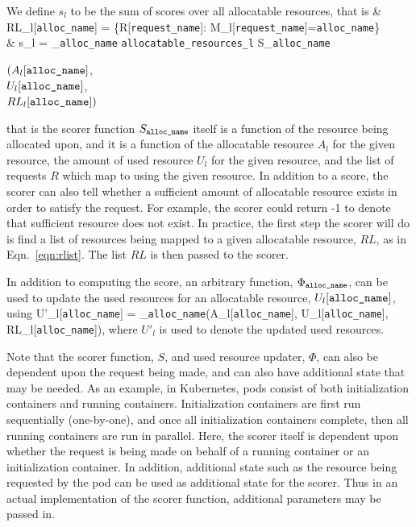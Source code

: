 \documentclass[12pt,onecolumn]{IEEEtran}
\newcommand{\bus}{\_\allowbreak}
\begin{document}
We define $s_l$ to be the sum of scores over all allocatable resources,
that is
\bea
& RL_l[\texttt{alloc{\bus}name}] = \{R[\texttt{request{\bus}name}]: M_l[\texttt{request{\bus}name}]=\texttt{alloc{\bus}name}\} \label{eqn:rlist} \\
& s_l = \sum\limits_{\texttt{alloc{\bus}name} \in \texttt{allocatable{\bus}resources{\bus}l}} 
  S_{\texttt{alloc{\bus}name}}
\parbox[t]{3in}{
$(A_l[\texttt{alloc{\bus}name}]$, \\
$U_l[\texttt{alloc{\bus}name}]$, \\
$RL_l[\texttt{alloc{\bus}name}])$
}
\label{eqn:scorel}
\eea
that is the scorer function $S_{\texttt{alloc{\bus}name}}$ itself is a function
of the resource being allocated upon, and it is a function
of the allocatable resource $A_l$ for the given resource,
the amount of used resource $U_l$ for the given resource, and
the list of requests $R$ which map to using the given resource.
In addition to a score, the scorer can also tell whether a
sufficient amount of allocatable resource exists in order to satisfy
the request.
For example, the scorer could return -1 to denote that sufficient resource
does not exist.
In practice, the first step the scorer will do is 
find a list of resources being mapped to a given allocatable resource, $RL$,
as in Eqn.~\ref{eqn:rlist}.
The list $RL$ is then passed to the scorer.

In addition to computing the score, an arbitrary function,
$\Phi_{\texttt{alloc{\bus}name}}$, can be
used to update the used resources for an allocatable resource,
$U_l[\texttt{alloc{\bus}name}]$, using
\bea
U'_l[\texttt{alloc{\bus}name}] = 
  \Phi_{\texttt{alloc{\bus}name}}(A_l[\texttt{alloc{\bus}name}], U_l[\texttt{alloc{\bus}name}],
       RL_l[\texttt{alloc{\bus}name}]),
\eea
where $U'_l$ is used to denote the updated used resources.

Note that the scorer function, $S$, and used resource updater, $\Phi$,
can also be dependent upon the request
being made, and can also have additional state that may be needed.
As an example, in Kubernetes, pods consist of
both initialization containers and running containers.
Initialization containers are first run sequentially (one-by-one),
and once all initialization containers complete, then all running
containers are run in parallel.
Here, the scorer itself is dependent upon whether the request is
being made on behalf of a running container or an initialization container.
In addition, additional state such as the resource being requested
by the pod can be used as additional state for the scorer.
Thus in an actual implementation of the scorer function, additional
parameters may be passed in.
\end{document}
